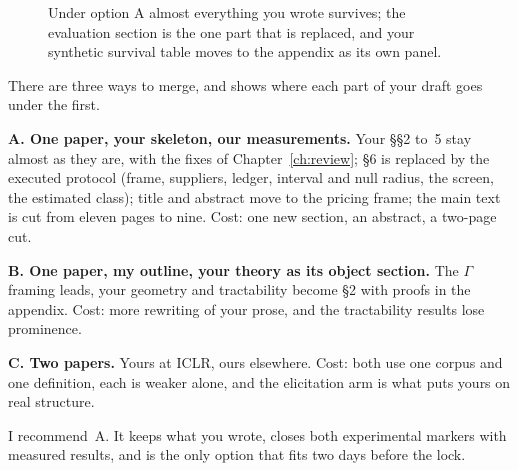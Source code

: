 \begin{figure}[!htbp]
\caption{Under option A almost everything you wrote survives; the evaluation section is the one part that
is replaced, and your synthetic survival table moves to the appendix as its own panel.}
\label{fig:merge-map}
\end{figure}

There are three ways to merge, and  shows where each part of your draft goes under
the first.

\textbf{A. One paper, your skeleton, our measurements.} Your \S\S2 to~5 stay almost as they are, with
the fixes of Chapter~\ref{ch:review}; \S6 is replaced by the executed protocol (frame, suppliers, ledger,
interval and null radius, the screen, the estimated class); title and abstract move to the pricing frame;
the main text is cut from eleven pages to nine. Cost: one new section, an abstract, a two-page cut.

\textbf{B. One paper, my outline, your theory as its object section.} The $\Gamma$ framing leads, your
geometry and tractability become \S2 with proofs in the appendix. Cost: more rewriting of your prose, and
the tractability results lose prominence.

\textbf{C. Two papers.} Yours at ICLR, ours elsewhere. Cost: both use one corpus and one definition, each is
weaker alone, and the elicitation arm is what puts yours on real structure.

I recommend~A. It keeps what you wrote, closes both experimental markers with measured results, and is the
only option that fits two days before the lock.

